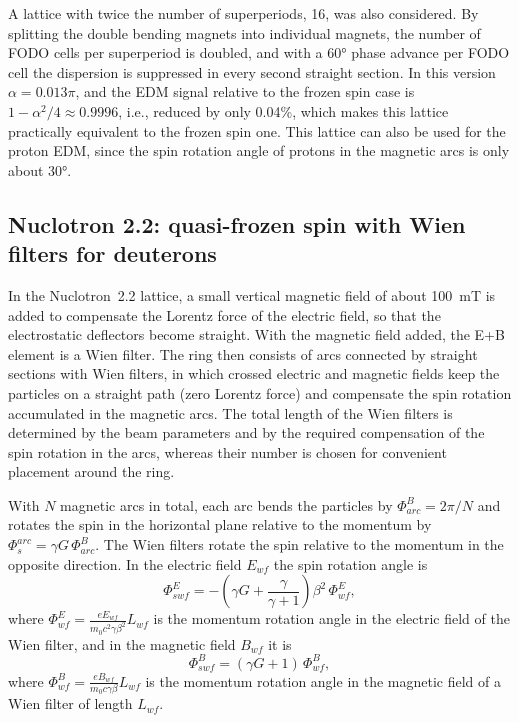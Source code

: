 A lattice with twice the number of superperiods, 16, was also considered.
By splitting the double bending magnets into individual magnets, the number of
FODO cells per superperiod is doubled, and with a \ang{60} phase advance per
FODO cell the dispersion is suppressed in every second straight section. In
this version $\alpha = 0.013\pi$, and the EDM signal relative to the frozen spin
case is $1-\alpha^2/4 \approx 0.9996$, i.e., reduced by only 0.04\%, which makes
this lattice practically equivalent to the frozen spin one. This lattice can
also be used for the proton EDM, since the spin rotation angle of protons in
the magnetic arcs is only about \ang{30}.

\subsection{Nuclotron 2.2: quasi-frozen spin with Wien filters for deuterons}

In the Nuclotron~2.2 lattice, a small vertical magnetic field of about
\SI{100}{mT} is added to compensate the Lorentz force of the electric field,
so that the electrostatic deflectors become straight. With the magnetic field
added, the E+B element is a Wien filter. The ring then consists of arcs
connected by straight sections with Wien filters, in which crossed electric
and magnetic fields keep the particles on a straight path (zero Lorentz force)
and compensate the spin rotation accumulated in the magnetic arcs. The total
length of the Wien filters is determined by the beam parameters and by the
required compensation of the spin rotation in the arcs, whereas their number
is chosen for convenient placement around the ring.

With $N$ magnetic arcs in total, each arc bends the particles by
$\Phi^B_{arc} = 2\pi/N$ and rotates the spin in the horizontal plane relative
to the momentum by $\Phi^{arc}_s = \gamma G\,\Phi^B_{arc}$. The Wien filters
rotate the spin relative to the momentum in the opposite direction. In the
electric field $E_{wf}$ the spin rotation angle is
\begin{equation}
  \Phi^E_{swf} = -\left(\gamma G+\frac{\gamma}{\gamma+1}\right)\beta^2\,\Phi^E_{wf},
\end{equation}
where $\Phi^E_{wf} = \frac{eE_{wf}}{m_0c^2\gamma\beta^2}L_{wf}$ is the momentum
rotation angle in the electric field of the Wien filter, and in the magnetic
field $B_{wf}$ it is
\begin{equation}
  \Phi^B_{swf} = (\gamma G+1)\,\Phi^B_{wf},
\end{equation}
where $\Phi^B_{wf} = \frac{eB_{wf}}{m_0c\gamma\beta}L_{wf}$ is the momentum
rotation angle in the magnetic field of a Wien filter of length $L_{wf}$.

